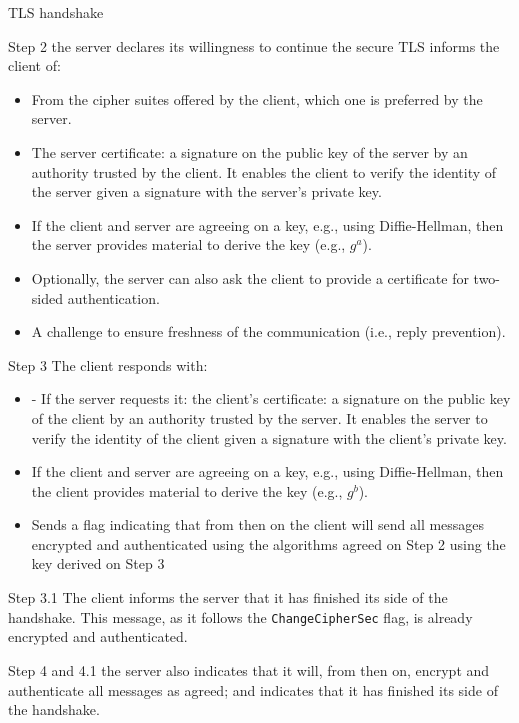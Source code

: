 \begin{parag}{TLS handshake}
\begin{subparag}{Step 2}
		the server declares its willingness to continue the secure TLS informs the
client of:
		\begin{itemize}
			\item From the cipher suites offered by the client, which one is preferred by the server.
			\item  The server certificate: a signature on the public key of the server by an authority trusted by the client. It enables the client to verify the identity of the server given a signature with the server’s private key.
			\item  If the client and server are agreeing on a key, e.g., using Diffie-Hellman, then the server provides material to derive the key (e.g., $g^{a}$).
			\item  Optionally, the server can also ask the client to provide a certificate for two-sided authentication.
			\item  A challenge to ensure freshness of the communication (i.e., reply prevention).
		\end{itemize}
	\end{subparag}
	\begin{subparag}{Step 3}
	    The client responds with:
		\begin{itemize}
			\item - If the server requests it: the client’s certificate: a signature on the public key of the client by an authority trusted by the server. It enables the server to verify the identity of the client given a signature with the client’s private key.
		\item  If the client and server are agreeing on a key, e.g., using Diffie-Hellman, then the client provides material to derive the key (e.g., $g^{b}$).
		\item  Sends a flag indicating that from then on the client will send all messages encrypted and authenticated using the algorithms agreed on Step 2 using the key derived on Step 3
		\end{itemize}
	\end{subparag}
	\begin{subparag}{Step 3.1}
	    The client informs the server that it has finished its side of the handshake. This message, as it follows the \texttt{ChangeCipherSec} flag, is already encrypted and authenticated.
	\end{subparag}
	\begin{subparag}{Step 4 and 4.1}
	    the server also indicates that it will, from then on, encrypt and authenticate all messages as agreed; and indicates that it has finished its side of the handshake.

\end{subparag}
\end{parag}
